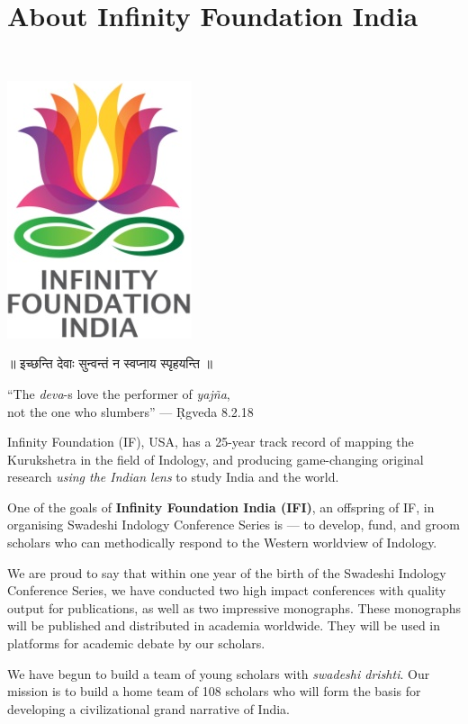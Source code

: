 \thispagestyle{empty}

\chapter*{About Infinity Foundation India}

~
\vskip -30pt

\centerline{\includegraphics[scale=0.25]{figures/logo.png}}\label{about}

\begin{center}
{\dev ॥ इच्छन्ति  देवाः सुन्वन्तं न स्वप्नाय स्पृहयन्ति ॥}

``The {\sl deva}-s love the performer of {\sl yajña},\\ 
not the one who slumbers'' --- Ṛgveda 8.2.18
\end{center} 

Infinity Foundation (IF), USA, has a 25-year track record of mapping the Kurukshetra in the field of Indology, and producing game-changing original research {\sl using the Indian lens} to study India and the world. 

One of the goals of {\bf Infinity Foundation India (IFI)}, an offspring of IF, in organising Swadeshi Indology Conference Series is --- to develop, fund, and groom scholars who can methodically respond to the Western worldview of Indology.

We are proud to say that within one year of the birth of the Swadeshi Indology Conference Series, we have conducted two high impact conferences with quality output for publications, as well as two impressive monographs. These monographs will be published and distributed in academia worldwide. They will be used in platforms for academic debate by our scholars.

We have begun to build a team of young scholars with {\sl swadeshi drishti}. Our mission is to build a home team of 108 scholars who will form the basis for developing a civilizational grand narrative of India.
